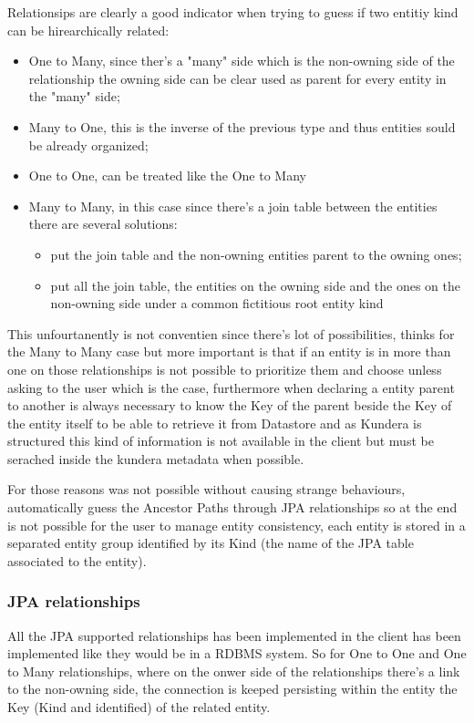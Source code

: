 Relationsips are clearly a good indicator when trying to guess if two entitiy kind can be hirearchically related:
\begin{itemize}
\item One to Many, since ther's a "many" side which is the non-owning side of the relationship the owning side can be clear used as parent for every entity in the "many" side;
\item Many to One, this is the inverse of the previous type and thus entities sould be already organized;
\item One to One, can be treated like the One to Many
\item Many to Many, in this case since there's a join table between the entities there are several solutions:
\begin{itemize}
\item put the join table and the non-owning entities parent to the owning ones;
\item put all the join table, the entities on the owning side and the ones on the non-owning side under a common fictitious root entity kind
\end{itemize}
\end{itemize}

This unfourtanently is not conventien since there's lot of possibilities, thinks for the Many to Many case but more important is that if an entity is in more than one on those relationships is not possible to prioritize them and choose unless asking to the user which is the case, furthermore when declaring a entity parent to another is always necessary to know the Key of the parent beside the Key of the entity itself to be able to retrieve it from Datastore and as Kundera is structured this kind of information is not available in the client but must be serached inside the kundera metadata when possible.

For those reasons was not possible without causing strange behaviours, automatically guess the Ancestor Paths through JPA relationships so at the end is not possible for the user to manage entity consistency, each entity is stored in a separated entity group identified by its Kind (the name of the JPA table associated to the entity).

\subsubsection{JPA relationships}
All the JPA supported relationships has been implemented in the client has been implemented like they would be in a RDBMS system.
So for One to One and One to Many relationships, where on the onwer side of the relationships there's a link to the non-owning side, the connection is keeped persisting within the entity the Key (Kind and identified) of the related entity.

